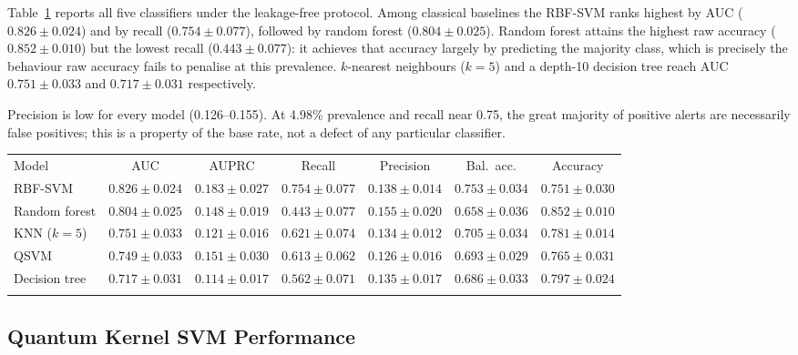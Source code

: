 \documentclass{ws-ijqi}
\begin{document}
Table~\ref{tab:honest} reports all five classifiers under the leakage-free
protocol. Among classical baselines the RBF-SVM ranks highest by AUC
($0.826\pm0.024$) and by recall ($0.754\pm0.077$), followed by random forest
($0.804\pm0.025$). Random forest attains the highest raw accuracy
($0.852\pm0.010$) but the lowest recall ($0.443\pm0.077$): it achieves that
accuracy largely by predicting the majority class, which is precisely the
behaviour raw accuracy fails to penalise at this prevalence. $k$-nearest
neighbours ($k=5$) and a depth-10 decision tree reach AUC $0.751\pm0.033$ and
$0.717\pm0.031$ respectively.

Precision is low for every model (0.126--0.155). At 4.98\% prevalence and
recall near 0.75, the great majority of positive alerts are necessarily false
positives; this is a property of the base rate, not a defect of any particular
classifier.

\begin{table}[htb]
{\fontsize{8}{10}\selectfont\setlength{\tabcolsep}{3.5pt}
\begin{tabular}{@{}lcccccc@{}}
\toprule
Model & AUC & AUPRC & Recall & Precision & Bal.\ acc. & Accuracy \\
\colrule
RBF-SVM       & $\mathbf{0.826\pm0.024}$ & $0.183\pm0.027$ & $0.754\pm0.077$ & $0.138\pm0.014$ & $0.753\pm0.034$ & $0.751\pm0.030$ \\
Random forest & $0.804\pm0.025$ & $0.148\pm0.019$ & $0.443\pm0.077$ & $0.155\pm0.020$ & $0.658\pm0.036$ & $0.852\pm0.010$ \\
KNN ($k=5$)   & $0.751\pm0.033$ & $0.121\pm0.016$ & $0.621\pm0.074$ & $0.134\pm0.012$ & $0.705\pm0.034$ & $0.781\pm0.014$ \\
QSVM          & $0.749\pm0.033$ & $0.151\pm0.030$ & $0.613\pm0.062$ & $0.126\pm0.016$ & $0.693\pm0.029$ & $0.765\pm0.031$ \\
Decision tree & $0.717\pm0.031$ & $0.114\pm0.017$ & $0.562\pm0.071$ & $0.135\pm0.017$ & $0.686\pm0.033$ & $0.797\pm0.024$ \\
\botrule
\end{tabular}}
\label{tab:honest}
\end{table}

\subsection{Quantum Kernel SVM Performance}
\label{sec:qresults}
\end{document}
